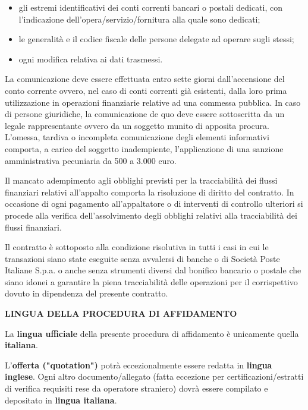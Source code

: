 \begin{itemize}

\item gli estremi identificativi dei conti correnti bancari o postali
dedicati, con l'indicazione dell'opera/servizio/fornitura alla quale
sono dedicati;

\item le generalità e il codice fiscale delle persone delegate ad
operare sugli stessi;

\item ogni modifica relativa ai dati trasmessi. 
\end{itemize}

La comunicazione deve essere effettuata entro sette giorni dall'accensione
del conto corrente ovvero, nel caso di conti correnti già esistenti,
dalla loro prima utilizzazione in operazioni finanziarie relative ad
una commessa pubblica. In caso di persone giuridiche, la comunicazione
de quo deve essere sottoscritta da un legale rappresentante ovvero da
un soggetto munito di apposita procura. L'omessa, tardiva o incompleta
comunicazione degli elementi informativi comporta, a carico del soggetto
inadempiente, l'applicazione di una sanzione amministrativa pecuniaria
da 500 a 3.000 euro.

Il mancato adempimento agli obblighi previsti per la tracciabilità
dei flussi finanziari relativi all'appalto comporta la risoluzione di
diritto del contratto. In occasione di ogni pagamento all'appaltatore
o di interventi di controllo ulteriori si procede alla verifica
dell'assolvimento degli obblighi relativi alla tracciabilità dei
flussi finanziari.

Il contratto è sottoposto alla condizione risolutiva in tutti i casi
in cui le transazioni siano state eseguite senza avvalersi di banche
o di Società Poste Italiane S.p.a. o anche senza strumenti diversi
dal bonifico bancario o postale che siano idonei a garantire la piena
tracciabilità delle operazioni per il corrispettivo dovuto in dipendenza
del presente contratto.

\textbf{LINGUA DELLA PROCEDURA DI AFFIDAMENTO}

La \textbf{lingua ufficiale} della presente procedura di affidamento è unicamente quella \textbf{italiana}. 

L'\textbf{offerta ("quotation")} potrà eccezionalmente essere
redatta in \textbf{lingua inglese}. Ogni altro documento/allegato
(fatta eccezione per certificazioni/estratti di verifica requisiti
rese da operatore straniero) dovrà essere compilato e depositato in
\textbf{lingua italiana}.

